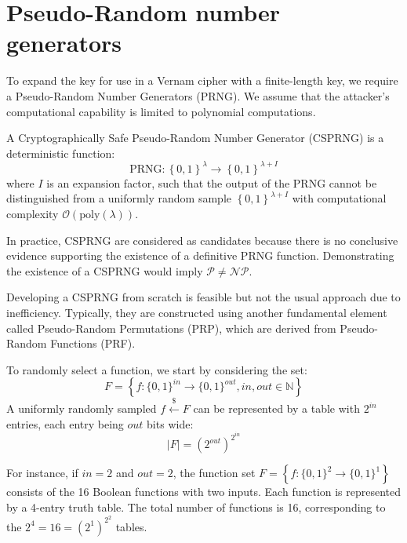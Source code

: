 \section{Pseudo-Random number generators}

To expand the key for use in a Vernam cipher with a finite-length key, we require a Pseudo-Random Number Generators (PRNG).
We assume that the attacker's computational capability is limited to polynomial computations. 
\begin{definition}
    A Cryptographically Safe Pseudo-Random Number Generator (CSPRNG) is a deterministic function:
    \[\text{PRNG}:\left\{ 0,1 \right\}^\lambda \rightarrow \left\{ 0,1 \right\}^{\lambda+I}\] 
    where $I$ is an expansion factor, such that the output of the PRNG cannot be distinguished from a uniformly random sample $ \left\{ 0,1 \right\}^{\lambda+I}$ with computational complexity $\mathcal{O} (\text{poly}(\lambda))$. 
\end{definition}
In practice, CSPRNG are considered as candidates because there is no conclusive evidence supporting the existence of a definitive PRNG function.
Demonstrating the existence of a CSPRNG would imply $\mathcal{P} \neq \mathcal{NP}$.

Developing a CSPRNG from scratch is feasible but not the usual approach due to inefficiency. 
Typically, they are constructed using another fundamental element called Pseudo-Random Permutations (PRP), which are derived from Pseudo-Random Functions (PRF).

To randomly select a function, we start by considering the set:
\[F=\left\{ f:\{0,1\}^{in}\rightarrow\{0,1\}^{out}, in,out \in \mathbb{N}  \right\}\]
A uniformly randomly sampled $f \overset{\$}{\leftarrow}F$  can be represented by a table with $2^{in}$ entries, each entry being $out$ bits wide: 
\[\left\lvert F \right\rvert = \left( 2^{out} \right)^{2^{in}}\]
\begin{example}
    For instance, if $in=2$ and $out = 2$, the function set $F=\left\{ f:\{0,1\}^{2}\rightarrow\{0,1\}^{1} \right\}$ consists of the 16 Boolean functions with two inputs.
    Each function is represented by a 4-entry truth table.
    The total number of functions is 16, corresponding to the $2^4=16=\left( 2^1 \right)^{2^2}$ tables.
\end{example}

